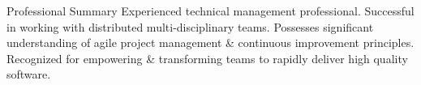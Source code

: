 \documentclass{resume} %
\begin{document}
\vspace{1em}

\begin{rSection}{Professional Summary}
Experienced technical management professional. Successful in working with distributed multi-disciplinary teams. Possesses significant understanding of agile project management \& continuous improvement principles. Recognized for empowering \& transforming teams to rapidly deliver high
quality software.
\end{rSection}

\end{document}
